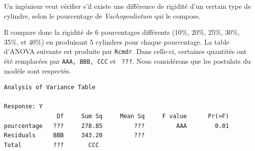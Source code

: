\begin{questions}
\newpage

\question[] 
Un ingénieur veut vérifier s'il existe une différence de rigidité d'un certain type de cylindre, selon le pourcentage de \textit{Vachopouliotum} qui le compose.

Il compare donc la rigidité de 6 pourcentages différents (10\%, 20\%, 25\%, 30\%, 35\%, et 40\%) en produisant 5 cylindres pour chaque pourcentage.
La table d'ANOVA suivante est produite par \texttt{Rcmdr}. 
Dans celle-ci, certaines quantités ont été remplacées par \texttt{AAA, BBB, CCC} et \texttt{ ???}. Nous considérons que les postulats du modèle sont respectés.
\begin{verbatim}
Analysis of Variance Table

Response: Y
               Df     Sum Sq     Mean Sq     F value      Pr(>F)  
pourcentage   ???     278.85         ???         AAA        0.01 
Residuals     BBB     343.20         ???                  
Total         ???       CCC
\end{verbatim}

\end{questions}
